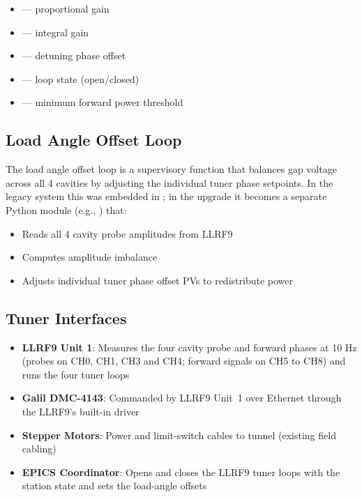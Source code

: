 \begin{itemize}
\tightlist
\item
   --- proportional gain
\item
   --- integral gain
\item
   --- detuning phase offset
\item
   --- loop state (open/closed)
\item
   --- minimum forward power threshold
\end{itemize}

\subsection{Load Angle Offset Loop}\label{load-angle-offset-loop}

The load angle offset loop is a supervisory function that balances gap voltage across all 4 cavities by adjusting the individual tuner phase setpoints. In the legacy system this was embedded in ; in the upgrade it becomes a separate Python module (e.g., ) that:

\begin{itemize}
\tightlist
\item
  Reads all 4 cavity probe amplitudes from LLRF9
\item
  Computes amplitude imbalance
\item
  Adjusts individual tuner phase offset PVs to redistribute power
\end{itemize}

\subsection{Tuner Interfaces}\label{tuner-interfaces}

\begin{itemize}
\tightlist
\item
  \textbf{LLRF9 Unit 1}: Measures the four cavity probe and forward phases at 10 Hz (probes on CH0, CH1, CH3 and CH4; forward signals on CH5 to CH8) and runs the four tuner loops
\item
  \textbf{Galil DMC-4143}: Commanded by LLRF9 Unit~1 over Ethernet through the LLRF9's built-in driver
\item
  \textbf{Stepper Motors}: Power and limit-switch cables to tunnel (existing field cabling)
\item
  \textbf{EPICS Coordinator}: Opens and closes the LLRF9 tuner loops with the station state and sets the load-angle offsets
\end{itemize}

